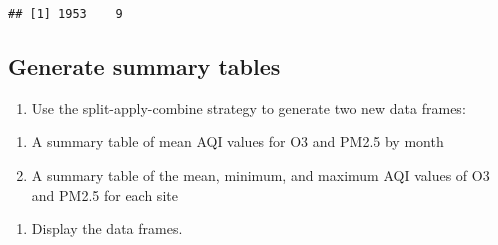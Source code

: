 \documentclass[]{article}
\newenvironment{Shaded}{\begin{snugshade}}{\end{snugshade}}
\newcommand{\KeywordTok}[1]{\textcolor[rgb]{0.13,0.29,0.53}{\textbf{#1}}}
\newcommand{\DataTypeTok}[1]{\textcolor[rgb]{0.13,0.29,0.53}{#1}}
\newcommand{\StringTok}[1]{\textcolor[rgb]{0.31,0.60,0.02}{#1}}
\newcommand{\CommentTok}[1]{\textcolor[rgb]{0.56,0.35,0.01}{\textit{#1}}}
\newcommand{\OtherTok}[1]{\textcolor[rgb]{0.56,0.35,0.01}{#1}}
\newcommand{\NormalTok}[1]{#1}
\providecommand{\tightlist}{%
  \setlength{\itemsep}{0pt}\setlength{\parskip}{0pt}}
\begin{document}
\begin{Shaded}
\end{Shaded}

\begin{verbatim}
## [1] 1953    9
\end{verbatim}

\begin{Shaded}
\end{Shaded}

\subsection{Generate summary tables}\label{generate-summary-tables}

\begin{enumerate}
\def\labelenumi{\arabic{enumi}.}
\setcounter{enumi}{11}
\tightlist
\item
  Use the split-apply-combine strategy to generate two new data frames:
\end{enumerate}

\begin{enumerate}
\def\labelenumi{\alph{enumi}.}
\tightlist
\item
  A summary table of mean AQI values for O3 and PM2.5 by month
\item
  A summary table of the mean, minimum, and maximum AQI values of O3 and
  PM2.5 for each site
\end{enumerate}

\begin{enumerate}
\def\labelenumi{\arabic{enumi}.}
\setcounter{enumi}{12}
\tightlist
\item
  Display the data frames.
\end{enumerate}
\end{document}
